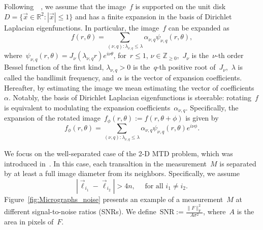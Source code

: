\documentclass{article}
\begin{document}
Following~~\cite{marshall2020image, bendory2021multi, kreymer2021two}, we assume that the image~$f$ is supported on the unit disk \mbox{$D = \{\vec{x} \in \mathbb{R}^2: |\vec{x}| \le 1\}$} and has a finite expansion in the basis of Dirichlet Laplacian eigenfunctions. In particular, the image~$f$ can be expanded as
\begin{equation}
\label{eq:expansion}
f (r, \theta) = \sum_{(\nu, q): \lambda_{\nu, q} \le \lambda} \alpha_{\nu, q} \psi_{\nu, q} (r, \theta),
\end{equation}
where~$\psi_{\nu, q}(r,\theta) = J_\nu\left( \lambda_{\nu, q} r \right) e^{i \nu \theta}$, for~\mbox{$r \le 1$}, $\nu \in \mathbb{Z}_{\ge 0}$,~$J_\nu$ is the~\mbox{$\nu$-th} order Bessel function of the first kind, \mbox{$\lambda_{\nu, q} > 0$} is the~\mbox{$q$-th} positive root of~$J_\nu$,~$\lambda$ is called the bandlimit frequency, and~$\alpha$ is the vector of expansion coefficients. Hereafter, by estimating the image we mean estimating the vector of coefficients~$\alpha$. Notably, the basis of Dirichlet Laplacian eigenfunctions is steerable: rotating~$f$ is equivalent to modulating the expansion coefficients~$\alpha_{\nu, q}$. Specifically, the expansion of the rotated image~$f_\phi (r, \theta) := f(r, \theta + \phi)$ is given by
\begin{equation}
\label{eq:steering}
f_\phi (r, \theta) = \sum_{(\nu, q): \lambda_{\nu, q} \le \lambda} \alpha_{\nu, q} \psi_{\nu, q} (r, \theta) e^{i \nu \phi}.
\end{equation}

We focus on the \mbox{well-separated} case of the 2-D MTD problem, which was introduced in~\cite{marshall2020image, bendory2021multi}. In this case, each transaltion in the measurement~$M$ is separated by at least a full image diameter from its neighbors. Specifically, we assume
\begin{equation}
\label{eq:sep}
|\vec{\ell}_{i_1} - \vec{\ell}_{i_2}| > 4n, \quad \text{ for all } i_1 \ne i_2.
\end{equation}
Figure~\ref{fig:Micrographs_noise} presents an example of a measurement~$M$ at different signal-to-noise ratios (SNRs). We define~\mbox{$\text{SNR} := \frac{\|F\|_\text{F}^2}{A \sigma^2}$}, where~$A$ is the area in pixels of~$F$.
\end{document}
